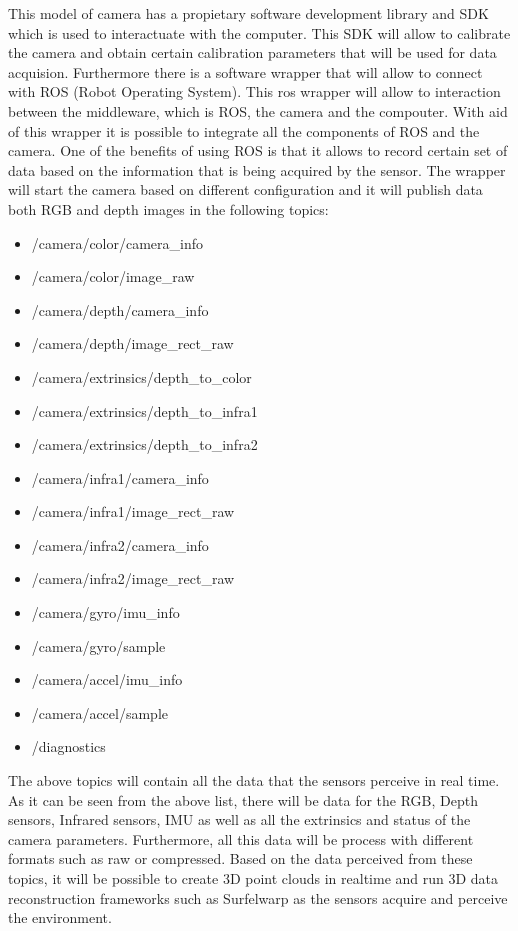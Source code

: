 \documentclass[12pt]{report}
\begin{document}
This model of camera has a propietary software development library and SDK which is used to interactuate with the computer. This SDK will allow to calibrate the camera and 
obtain certain calibration parameters that will be used for data acquision. 
Furthermore there is a software wrapper that will allow to connect with ROS (Robot Operating System). This ros wrapper will allow to interaction between the middleware, which is ROS, the camera and the compouter. 
With aid of this wrapper it is possible to integrate all the components of ROS and the camera. 
One of the benefits of using ROS is that it allows to record certain set of data based on the information that is being  acquired by the sensor. 
The wrapper will start the camera based on different configuration and it will publish data both RGB and depth images in the following topics:

\begin{itemize}
  \item  /camera/color/camera\_info
  \item  /camera/color/image\_raw
  \item /camera/depth/camera\_info
  \item /camera/depth/image\_rect\_raw
  \item /camera/extrinsics/depth\_to\_color
  \item /camera/extrinsics/depth\_to\_infra1
  \item /camera/extrinsics/depth\_to\_infra2
  \item /camera/infra1/camera\_info
  \item /camera/infra1/image\_rect\_raw
  \item /camera/infra2/camera\_info
  \item /camera/infra2/image\_rect\_raw
  \item /camera/gyro/imu\_info
  \item /camera/gyro/sample
  \item /camera/accel/imu\_info
  \item /camera/accel/sample
  \item /diagnostics
\end{itemize}
The above topics will contain all the data that the sensors perceive in real time. As it can be seen from the above list, there will be data for the RGB, Depth sensors, Infrared sensors, IMU as well as all the extrinsics and status of the camera parameters. 
Furthermore, all this data will be process with different formats such as raw or compressed. Based on the data perceived from these topics, it will be possible to create 3D point clouds in realtime and run 3D data reconstruction frameworks such as Surfelwarp as the sensors acquire and perceive the environment. 
\end{document}
